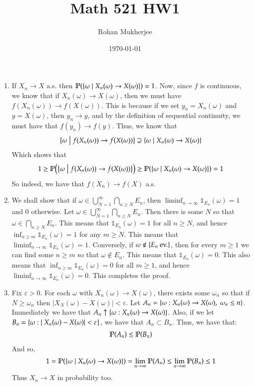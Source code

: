 \documentclass[12pt]{article}
\title{Math 521 HW1}
\date{\today}
\author{Rohan Mukherjee}
\theoremstyle{definitionstyle}
\def\ve{\varepsilon}
\newcommand{\SET}[1]{\Set{\mskip-\medmuskip #1 \mskip-\medmuskip}}
\newcommand{\1}{\mathds 1}
\renewcommand{\P}{\mathbb P \qty}
\begin{document}
    \maketitle
    \begin{enumerate}
        \item If $X_n \to X$ a.s. then $\P(\SET{\omega | X_n(\omega) \to X(\omega)}) = 1$. Now, since $f$ is continuous, we know that if $X_n(\omega) \to X(\omega)$, then we must have $f(X_n(\omega)) \to f(X(\omega))$. This is because if we set $y_n = X_n(\omega)$ and $y = X(\omega)$, then $y_n \to y$, and by the definition of sequential continuity, we must have that $f(y_n) \to f(y)$. Thus, we know that 
        \begin{align*}
            \SET{\omega | f(X_n(\omega)) \to f(X(\omega))} \supseteq \SET{\omega | X_n(\omega) \to X(\omega)}
        \end{align*}
        Which shows that 
        \begin{align*}
            1 \geq \P(\SET{\omega | f(X_n(\omega)) \to f(X(\omega))}) \geq \P(\SET{\omega | X_n(\omega) \to X(\omega)}) = 1
        \end{align*}
        So indeed, we have that $f(X_n) \to f(X)$ a.s.

        \item We shall show that if $\omega \in \bigcup_{N=1}^\infty \bigcap_{n \geq N} E_n$, then $\liminf_{n \to \infty} \1_{E_n}(\omega) = 1$ and $0$ otherwise. Let $\omega \in \bigcup_{N=1}^\infty \bigcap_{n \geq N} E_n$. Then there is some $N$ so that $\omega \in \bigcap_{n \geq N} E_n$. This means that $\1_{E_n}(\omega) = 1$ for all $n \geq N$, and hence $\inf_{n \geq m} \1_{E_n}(\omega) = 1$ for any $m \geq N$. This means that $\liminf_{n \to \infty} \1_{E_n}(\omega) = 1$. Conversely, if $\omega \not \in \SET{E_n \text{ ev.}}$, then for every $m \geq 1$ we can find some $n \geq m$ so that $\omega \not \in E_n$. This means that $\1_{E_n}(\omega) = 0$. This also means that $\inf_{n \geq m} \1_{E_n}(\omega) = 0$ for all $m \geq 1$, and hence $\liminf_{n \to \infty} \1_{E_n}(\omega) = 0$. This completes the proof.

        \item Fix $\ve > 0$. For each $\omega$ with $X_n(\omega) \to X(\omega)$, there exists some $\omega_n$ so that if $N \geq \omega_n$ then $|X_N(\omega)-X(\omega)| < \ve$. Let $A_n = \SET{\omega : X_n(\omega) \to X(\omega), \; \omega_n \leq n}$. Immediately we have that $A_n \uparrow \SET{\omega : X_n(\omega) \to X(\omega)}$. Also, if we let $B_n = \SET{\omega : |X_n(\omega) - X(\omega)| < \ve}$, we have that $A_n \subset B_n$. Thus, we have that:
        \begin{align*}
            \P(A_n) \leq \P(B_n)
        \end{align*}
        And so,
        \begin{align*}
            1 = \P(\SET{\omega | X_n(\omega) \to X(\omega)}) = \lim_{n \to \infty} \P(A_n) \leq \lim_{n \to \infty} \P(B_n) \leq 1
        \end{align*}
        Thus $X_n \to X$ in probability too.


\end{enumerate}
\end{document}
